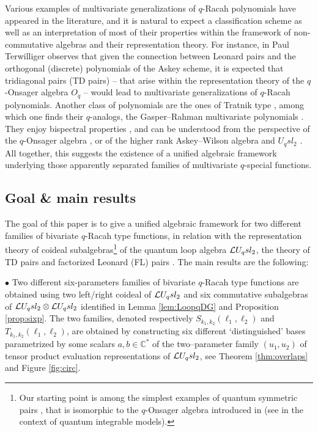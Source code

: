 \documentclass[11pt]{amsart}
\numberwithin{equation}{section}
\numberwithin{equation}{section}
\begin{document}
Various examples of multivariate generalizations of $q$-Racah polynomials have appeared in the literature, and it is natural to expect a classification scheme as well as an interpretation of most of their properties within the framework of non-commutative algebras and their representation theory. For instance, in \cite[Sec.\,2]{Ter03} Paul Terwilliger observes that 
given the connection between Leonard pairs and the orthogonal (discrete) polynomials of the Askey scheme, it is expected that tridiagonal pairs (TD pairs) -- that arise within the representation theory of the $q$-Onsager algebra $O_q$ \cite{Ter03,B04} -- would lead to multivariate generalizations of $q$-Racah polynomials. Another class of polynomials are the ones of Tratnik type \cite{T91a,T91b}, among which one finds their $q$-analogs, the Gasper--Rahman multivariate polynomials \cite{GR05}. They enjoy bispectral properties \cite{I08}, and can be understood from the perspective of the $q$-Onsager algebra \cite{BM15}, or of the higher rank Askey--Wilson algebra and $U_qsl_2$ \cite{G25}. All together, this suggests the existence of a unified algebraic framework  underlying those apparently separated families of multivariate $q$-special functions.

 \subsection{Goal \& main results} 
The goal of this paper is to give a unified algebraic framework for two different families of bivariate $q$-Racah type functions, in relation with the representation theory of coideal subalgebras\footnote{Our starting point is among the simplest examples of quantum symmetric pairs \cite{Ko12}, that is isomorphic to the $q$-Onsager algebra introduced in \cite{Ter03} (see \cite{B04} in the context of quantum integrable models).} of the quantum loop algebra $\mathcal{L} U_q sl_2$, the theory of TD pairs \cite{ITT99,Ter03} and factorized Leonard (FL) pairs  \cite{CZ23}.
 The main results are the following:
 
$\bullet$ Two different six-parameters families  of bivariate $q$-Racah type functions are  obtained using 
 two left/right coideal of $\mathcal{L} U_q sl_2$ and six commutative subalgebras  of $\mathcal{L} U_q sl_2 \otimes \mathcal{L} U_q sl_2$ identified in  Lemma \ref{lem:LoopqDG} and Proposition \ref{prop:sixp}. The two families, denoted respectively $S_{k_1,k_2}(\ell_1,\ell_2)$ and $T_{k_1,k_2}(\ell_1,\ell_2)$, are obtained by constructing six different `distinguished' bases parametrized  by some scalars $a,b \in {\mathbb C}^*$ of the two--parameter family $(u_1,u_2)$ of tensor product evaluation representations of $\mathcal{L} U_q sl_2$, see Theorem \ref{thm:overlaps} and Figure \ref{fig:circ}.
\end{document}
